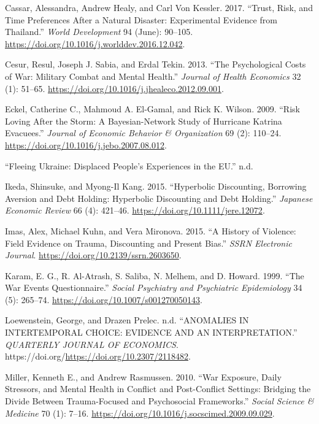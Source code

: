 \documentclass[
  letterpaper,
  DIV=11,
  numbers=noendperiod]{scrartcl}
\newlength{\cslhangindent}
\newlength{\cslentryspacingunit} %
\newenvironment{CSLReferences}[2] %
 {%
  \setlength{\parindent}{0pt}
  \ifodd #1
  \let\oldpar\par
  \def\par{\hangindent=\cslhangindent\oldpar}
  \fi
  \setlength{\parskip}{#2\cslentryspacingunit}
 }%
 {}
\begin{document}
\hypertarget{refs}{}
\begin{CSLReferences}{1}{0}
\leavevmode{}%
Cassar, Alessandra, Andrew Healy, and Carl Von Kessler. 2017. {``Trust,
Risk, and Time Preferences After a Natural Disaster: Experimental
Evidence from Thailand.''} \emph{World Development} 94 (June): 90--105.
\url{https://doi.org/10.1016/j.worlddev.2016.12.042}.

\leavevmode{}%
Cesur, Resul, Joseph J. Sabia, and Erdal Tekin. 2013. {``The
Psychological Costs of War: Military Combat and Mental Health.''}
\emph{Journal of Health Economics} 32 (1): 51--65.
\url{https://doi.org/10.1016/j.jhealeco.2012.09.001}.

\leavevmode{}%
Eckel, Catherine C., Mahmoud A. El-Gamal, and Rick K. Wilson. 2009.
{``Risk Loving After the Storm: A Bayesian-Network Study of Hurricane
Katrina Evacuees.''} \emph{Journal of Economic Behavior \& Organization}
69 (2): 110--24. \url{https://doi.org/10.1016/j.jebo.2007.08.012}.

\leavevmode{}%
{``Fleeing Ukraine: Displaced People{'}s Experiences in the EU.''} n.d.

\leavevmode{}%
Ikeda, Shinsuke, and Myong-Il Kang. 2015. {``Hyperbolic Discounting,
Borrowing Aversion and Debt Holding: Hyperbolic Discounting and Debt
Holding.''} \emph{Japanese Economic Review} 66 (4): 421--46.
\url{https://doi.org/10.1111/jere.12072}.

\leavevmode{}%
Imas, Alex, Michael Kuhn, and Vera Mironova. 2015. {``A History of
Violence: Field Evidence on Trauma, Discounting and Present Bias.''}
\emph{SSRN Electronic Journal}.
\url{https://doi.org/10.2139/ssrn.2603650}.

\leavevmode{}%
Karam, E. G., R. Al-Atrash, S. Saliba, N. Melhem, and D. Howard. 1999.
{``The War Events Questionnaire.''} \emph{Social Psychiatry and
Psychiatric Epidemiology} 34 (5): 265--74.
\url{https://doi.org/10.1007/s001270050143}.

\leavevmode{}%
Loewenstein, George, and Drazen Prelec. n.d. {``ANOMALIES IN
INTERTEMPORAL CHOICE: EVIDENCE AND AN INTERPRETATION.''} \emph{QUARTERLY
JOURNAL OF ECONOMICS}.
https://doi.org/\url{https://doi.org/10.2307/2118482}.

\leavevmode{}%
Miller, Kenneth E., and Andrew Rasmussen. 2010. {``War Exposure, Daily
Stressors, and Mental Health in Conflict and Post-Conflict Settings:
Bridging the Divide Between Trauma-Focused and Psychosocial
Frameworks.''} \emph{Social Science \& Medicine} 70 (1): 7--16.
\url{https://doi.org/10.1016/j.socscimed.2009.09.029}.


\end{CSLReferences}
\end{document}
